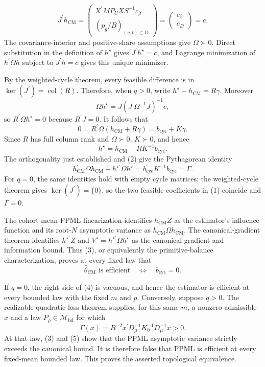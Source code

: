 \[
J^{\prime}h_{\mathrm{CM}}
=
\begin{pmatrix}
X^{\prime}MP_UXS^{-1}c_\beta\\
(p_g/B)_{(g,t)\in D}
\end{pmatrix}
=
\begin{pmatrix}c_\beta\\c_D\end{pmatrix}
=c.                                                     \tag{1}
\]
The covariance-interior and positive-share assumptions give \(\Omega\succ0\).  Direct substitution in the definition of \(h^\star\) gives
\(J^{\prime}h^\star=c\), and Lagrange minimization of
\(h^{\prime}\Omega h\) subject to \(J^{\prime}h=c\) gives this unique minimizer.

By the weighted-cycle theorem, every feasible difference is in
\(\ker(J^{\prime})=\operatorname{col}(R)\).  Therefore, when \(q>0\), write
\(h^\star-h_{\mathrm{CM}}=R\gamma\).  Moreover
\[
\Omega h^\star
=J(J^{\prime}\Omega^{-1}J)^{-1}c,
\]
so \(R^{\prime}\Omega h^\star=0\) because \(R^{\prime}J=0\).  It follows that
\[
0=R^{\prime}\Omega(h_{\mathrm{CM}}+R\gamma)
=b_{\mathrm{cyc}}+K\gamma.
\]
Since \(R\) has full column rank and \(\Omega\succ0\), \(K\succ0\), and hence
\[
h^\star=h_{\mathrm{CM}}-RK^{-1}b_{\mathrm{cyc}}.       \tag{2}
\]
The orthogonality just established and (2) give the Pythagorean identity
\[
h_{\mathrm{CM}}^{\prime}\Omega h_{\mathrm{CM}}
-h^{\star\prime}\Omega h^\star
=b_{\mathrm{cyc}}^{\prime}K^{-1}b_{\mathrm{cyc}}
=\Gamma.                                               \tag{3}
\]
For \(q=0\), the same identities hold with empty cycle matrices: the weighted-cycle theorem gives \(\ker(J^{\prime})=\{0\}\), so the two feasible coefficients in (1) coincide and \(\Gamma=0\).

The cohort-mean PPML linearization identifies
\(h_{\mathrm{CM}}^{\prime}Z\) as the estimator's influence function and its root-\(N\) asymptotic variance as
\(h_{\mathrm{CM}}^{\prime}\Omega h_{\mathrm{CM}}\).  The canonical-gradient theorem identifies \(h^{\star\prime}Z\) and \(V^\star=h^{\star\prime}\Omega h^\star\) as the canonical gradient and information bound.  Thus (3), or equivalently the primitive-balance characterization, proves at every fixed law that
\[
\widehat\theta_{\mathrm{CM}}\text{ is efficient}
\quad\Longleftrightarrow\quad
b_{\mathrm{cyc}}=0.                                   \tag{4}
\]

If \(q=0\), the right side of (4) is vacuous, and hence the estimator is efficient at every bounded law with the fixed \(m\) and \(p\).  Conversely, suppose \(q>0\).  The realizable-quadratic-loss theorem supplies, for this same \(m\), a nonzero admissible \(x\) and a law \(P_\rho\in\mathcal M_{\mathrm{bd}}\) for which
\[
\Gamma(x)
=B^{-2}x^{\prime}D_\mu^{-1}K_0^{-1}D_\mu^{-1}x>0.     \tag{5}
\]
At that law, (3) and (5) show that the PPML asymptotic variance strictly exceeds the canonical bound.  It is therefore false that PPML is efficient at every fixed-mean bounded law.  This proves the asserted topological equivalence.


